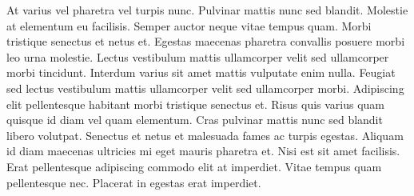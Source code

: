 \documentclass[epsf,a4paper]{book}
\begin{document}
At varius vel pharetra vel turpis nunc. Pulvinar mattis nunc sed blandit. Molestie at elementum eu facilisis. Semper auctor neque vitae tempus quam. Morbi tristique senectus et netus et. Egestas maecenas pharetra convallis posuere morbi leo urna molestie. Lectus vestibulum mattis ullamcorper velit sed ullamcorper morbi tincidunt. Interdum varius sit amet mattis vulputate enim nulla. Feugiat sed lectus vestibulum mattis ullamcorper velit sed ullamcorper morbi. Adipiscing elit pellentesque habitant morbi tristique senectus et. Risus quis varius quam quisque id diam vel quam elementum. Cras pulvinar mattis nunc sed blandit libero volutpat. Senectus et netus et malesuada fames ac turpis egestas. Aliquam id diam maecenas ultricies mi eget mauris pharetra et. Nisi est sit amet facilisis. Erat pellentesque adipiscing commodo elit at imperdiet. Vitae tempus quam pellentesque nec. Placerat in egestas erat imperdiet.

\appendix
\backmatter
\end{document}
